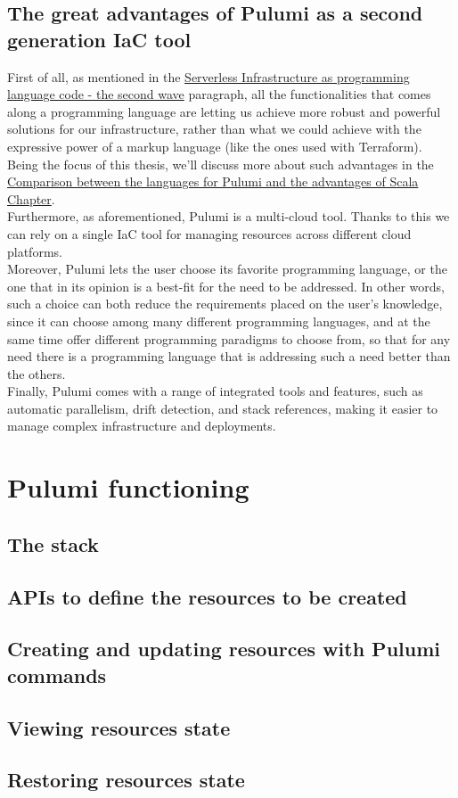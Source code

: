 \subsection{The great advantages of Pulumi as a second generation IaC tool}
First of all, as mentioned in the \hyperref[sssec:second-wave]{Serverless Infrastructure as programming language code - the second wave} paragraph, all the functionalities that comes along a programming language are letting us achieve more robust and powerful solutions for our infrastructure, rather than what we could achieve with the expressive power of a markup language (like the ones used with \gls{Terraform}).
Being the focus of this thesis, we'll discuss more about such advantages in the \hyperref[cap:comparison-between-languages]{Comparison between the languages for Pulumi and the advantages of Scala Chapter}.\\
Furthermore, as aforementioned, Pulumi is a multi-cloud tool. Thanks to this we can rely on a single IaC tool for managing resources across different cloud platforms.\\
Moreover, Pulumi lets the user choose its favorite programming language, or the one that in its opinion is a best-fit for the need to be addressed.
In other words, such a choice can both reduce the requirements placed on the user's knowledge, since it can choose among many different programming languages, 
and at the same time offer different programming paradigms to choose from, so that for any need there is a programming language that is addressing such a need better than the others.\\
Finally, Pulumi comes with a range of integrated tools and features, such as automatic parallelism, drift detection, and stack references, making it easier to manage complex infrastructure and deployments.

\section{Pulumi functioning}

\subsection{The stack}

\subsection{APIs to define the resources to be created}

\subsection{Creating and updating resources with Pulumi commands}

\subsection{Viewing resources state}

\subsection{Restoring resources state}

